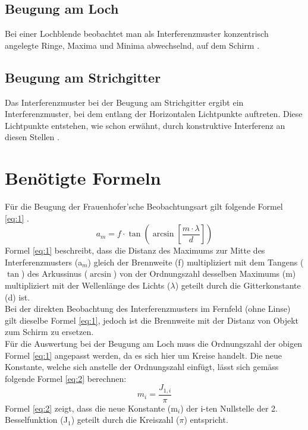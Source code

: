 \subsection{Beugung am Loch}
Bei einer Lochblende beobachtet man als Interferenzmuster konzentrisch angelegte Ringe, Maxima und Minima abwechselnd, auf dem Schirm \cite{Angaben2011}.\\
 
\subsection{Beugung am Strichgitter}
Das Interferenzmuster bei der Beugung am Strichgitter ergibt ein Interferenzmuster, bei dem entlang der Horizontalen Lichtpunkte auftreten. Diese Lichtpunkte entstehen, wie schon erwähnt, durch konstruktive Interferenz an diesen Stellen \cite{Angaben2011}.\\

\section{Benötigte Formeln}
Für die Beugung der Frauenhofer’sche Beobachtungsart gilt folgende Formel \ref{eq:1} \cite{Angaben2011}.\\
\begin{equation}
a_{m}=f\cdot\tan\left( \arcsin\left[ \frac{m\cdot\lambda}{d}\right] \right) 
\label{eq:1}
\end{equation}
Formel \ref{eq:1} beschreibt, dass die Distanz des Maximums zur Mitte des Interferenzmusters (a$_{m}$) gleich der Brennweite (f) multipliziert mit dem Tangens ($\tan$) des Arkussinus ($\arcsin$) von der Ordnungszahl desselben Maximums (m) multipliziert mit der Wellenlänge des Lichts ($\lambda$) geteilt durch die Gitterkonstante (d) ist.\\[0.5cm]Bei der direkten Beobachtung des Interferenzmusters im Fernfeld (ohne Linse) gilt dieselbe Formel \ref{eq:1}, jedoch ist die Brennweite mit der Distanz von Objekt zum Schirm zu ersetzen.\\[0.5cm]Für die Auswertung bei der Beugung am Loch muss die Ordnungszahl der obigen Formel \ref{eq:1} angepasst werden, da es sich hier um Kreise handelt. Die neue Konstante, welche sich anstelle der Ordnungszahl einfügt, lässt sich gemäss folgende Formel \ref{eq:2} berechnen:
\begin{equation}
m_{i}=\frac{J_{1,i}}{\pi}
\label{eq:2}
\end{equation}
Formel \ref{eq:2} zeigt, dass die neue Konstante (m$_{i}$) der i-ten Nullstelle der 2. Besselfunktion (J$_{1}$) geteilt durch die Kreiszahl ($\pi$) entspricht.

